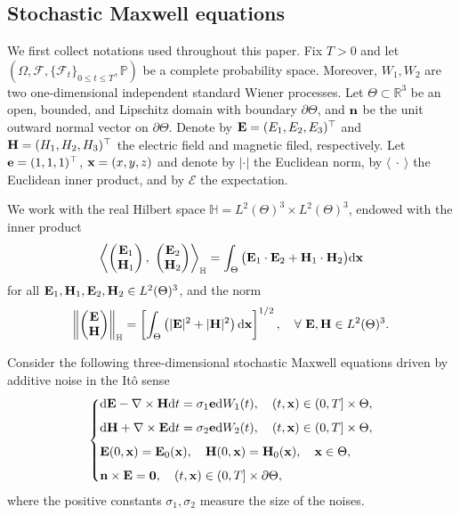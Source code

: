 \documentclass[preprint,12pt]{article}
\numberwithin{figure}{section}
\numberwithin{table}{section}
\numberwithin{equation}{section}
\begin{document}
\subsection{Stochastic Maxwell equations}
\label{sub_stochastic MEs}
We first collect notations used throughout this paper. Fix $T>0$ and let $(\Omega,\mathcal{F},\{\mathcal{F}_t\}_{0\leq t\leq T},\mathbb{P})$ be a complete probability space.  Moreover, $W_1,W_2$ are two one-dimensional independent standard Wiener processes. Let $\Theta\subset\mathbb{R}^3$ be an open, bounded, and Lipschitz domain with boundary $\partial \Theta$, and $\bf{n}$ be the unit outward normal vector on $\partial\Theta$. Denote by ${\bf{E}}=(E_1,E_2,E_3)^\top$ and ${\bf{H}}=(H_1,H_2,H_3)^\top$ the electric field and magnetic filed, respectively. Let ${\bf{e}}=(1,1,1)^\top$, ${\bf x}=(x,y,z)$ and  denote by $|\cdot|$ the Euclidean norm, by $\langle~\cdot~\rangle$ the Euclidean inner product, and by $\mathcal{E}$ the expectation. 
	
We work with the real Hilbert space $\mathbb{H}=L^2(\Theta)^3\times L^2(\Theta)^3$, endowed with the inner product
	\[
\left\langle \begin{pmatrix}
	{\bf E}_1\\{\bf H}_1
\end{pmatrix},~ \begin{pmatrix}
	{\bf E}_2\\{\bf H}_2
\end{pmatrix}\right\rangle_{\mathbb H}=\int_{\Theta}\big({\bf E}_1\cdot {\bf E}_2
+{\bf H}_1\cdot{\bf H}_2\big){\rm d}{\bf x}
\]
for all ${\bf E}_1, {\bf H}_1,{\bf E}_2,{\bf H}_2\in L^2(\Theta)^3$, and the norm
\[
\left\|\begin{pmatrix}
	{\bf E}\\{\bf H}
\end{pmatrix}\right\|_{\mathbb H}=\left[\int_{\Theta}\left(|{\bf E}|^2+|{\bf H}|^2\right){\rm d}{\bf x}\right]^{1/2},\quad \forall~{\bf E}, {\bf H}\in  L^2(\Theta)^3.
\]

Consider the following three-dimensional stochastic Maxwell equations driven by additive noise in the It\^o sense
\begin{equation}\label{2.1}	
\left \{
\begin{split}
		&{\rm d}{\bf E}-\nabla\times{\bf H} {\rm d}t=\sigma_{1}{\bf{e}}{\rm d}W_1(t),\quad (t,{\bf x})\in(0,T]\times\Theta,\\[1.5mm]
		&{\rm d}{\bf H}+\nabla\times{\bf E} {\rm d}t=\sigma_{2}{\bf{e}}{\rm d}W_2(t),\quad (t,{\bf x})\in(0,T]\times\Theta,\\[1.5mm]
		&{\bf E}(0,{\bf x})={\bf E}_0({\bf x}),\quad{\bf H}(0,{\bf x})={\bf H}_0({\bf x}),\quad {\bf x}\in\Theta,\\[1.5mm]
		&{\bf n}\times{\bf E}={\bf 0},\quad (t,{\bf x})\in(0,T]\times\partial\Theta,
\end{split}\right.
\end{equation}
where the positive constants $\sigma_{1},\sigma_{2}$ measure the size of the noises. 
\end{document}
